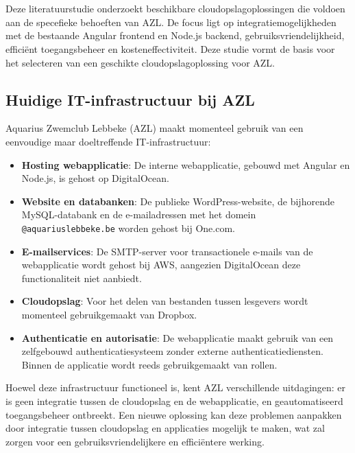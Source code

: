 \chapter{}%
\label{ch:stand-van-zaken}



Deze literatuurstudie onderzoekt beschikbare cloudopslagoplossingen die voldoen aan de specefieke behoeften van AZL. 
De focus ligt op integratiemogelijkheden met de bestaande Angular frontend en Node.js backend, gebruiksvriendelijkheid, efficiënt toegangsbeheer en kosteneffectiviteit. 
Deze studie vormt de basis voor het selecteren van een geschikte cloudopslagoplossing voor AZL.

\section{Huidige IT-infrastructuur bij AZL}
Aquarius Zwemclub Lebbeke (AZL) maakt momenteel gebruik van een eenvoudige maar doeltreffende IT-infrastructuur:
\begin{itemize}
    \item \textbf{Hosting webapplicatie}: De interne webapplicatie, gebouwd met Angular en Node.js, is gehost op DigitalOcean.
    \item \textbf{Website en databanken}: De publieke WordPress-website, de bijhorende MySQL-databank en de e-mailadressen met het domein \texttt{@aquariuslebbeke.be} worden gehost bij One.com.
    \item \textbf{E-mailservices}: De SMTP-server voor transactionele e-mails van de webapplicatie wordt gehost bij AWS, aangezien DigitalOcean deze functionaliteit niet aanbiedt.
    \item \textbf{Cloudopslag}: Voor het delen van bestanden tussen lesgevers wordt momenteel gebruikgemaakt van Dropbox.
    \item \textbf{Authenticatie en autorisatie}: De webapplicatie maakt gebruik van een zelfgebouwd authenticatiesysteem zonder externe authenticatiediensten. Binnen de applicatie wordt reeds gebruikgemaakt van rollen.
\end{itemize}
Hoewel deze infrastructuur functioneel is, kent AZL verschillende uitdagingen: er is geen integratie tussen de cloudopslag en de webapplicatie, en geautomatiseerd toegangsbeheer ontbreekt. Een nieuwe oplossing kan deze problemen aanpakken door integratie tussen cloudopslag en applicaties mogelijk te maken, wat zal zorgen voor een gebruiksvriendelijkere en efficiëntere werking.


